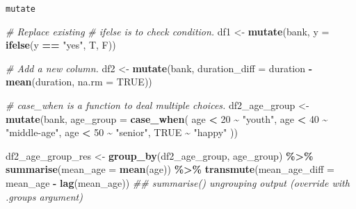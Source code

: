 \documentclass[
  10pt,
  ignorenonframetext,
  serif]{beamer}
\newenvironment{Shaded}{\begin{snugshade}}{\end{snugshade}}
\newcommand{\CommentTok}[1]{\textcolor[rgb]{0.56,0.35,0.01}{\textit{#1}}}
\newcommand{\DataTypeTok}[1]{\textcolor[rgb]{0.13,0.29,0.53}{#1}}
\newcommand{\DecValTok}[1]{\textcolor[rgb]{0.00,0.00,0.81}{#1}}
\newcommand{\KeywordTok}[1]{\textcolor[rgb]{0.13,0.29,0.53}{\textbf{#1}}}
\newcommand{\NormalTok}[1]{#1}
\newcommand{\OperatorTok}[1]{\textcolor[rgb]{0.81,0.36,0.00}{\textbf{#1}}}
\newcommand{\OtherTok}[1]{\textcolor[rgb]{0.56,0.35,0.01}{#1}}
\newcommand{\StringTok}[1]{\textcolor[rgb]{0.31,0.60,0.02}{#1}}
\begin{document}
\begin{frame}[fragile]{\texttt{mutate}}
\protect\hypertarget{mutate}{}
\begin{Shaded}
\begin{Highlighting}[]
\CommentTok{\# Replace existing}
\CommentTok{\# ifelse is to check condition.}
\NormalTok{df1 \textless{}{-}}\StringTok{ }\KeywordTok{mutate}\NormalTok{(bank, }\DataTypeTok{y =} \KeywordTok{ifelse}\NormalTok{(y }\OperatorTok{==}\StringTok{ "yes"}\NormalTok{, T, F))}

\CommentTok{\# Add a new column.}
\NormalTok{df2 \textless{}{-}}\StringTok{ }\KeywordTok{mutate}\NormalTok{(bank, }\DataTypeTok{duration\_diff =}\NormalTok{ duration }\OperatorTok{{-}}\StringTok{ }\KeywordTok{mean}\NormalTok{(duration, }\DataTypeTok{na.rm =} \OtherTok{TRUE}\NormalTok{))}

\CommentTok{\# case\_when is a function to deal multiple choices.}
\NormalTok{df2\_age\_group \textless{}{-}}\StringTok{ }\KeywordTok{mutate}\NormalTok{(bank, }\DataTypeTok{age\_group =} \KeywordTok{case\_when}\NormalTok{(}
\NormalTok{  age }\OperatorTok{\textless{}}\StringTok{ }\DecValTok{20} \OperatorTok{\textasciitilde{}}\StringTok{ "youth"}\NormalTok{,}
\NormalTok{  age }\OperatorTok{\textless{}}\StringTok{ }\DecValTok{40} \OperatorTok{\textasciitilde{}}\StringTok{ "middle{-}age"}\NormalTok{,}
\NormalTok{  age }\OperatorTok{\textless{}}\StringTok{ }\DecValTok{50} \OperatorTok{\textasciitilde{}}\StringTok{ "senior"}\NormalTok{,}
  \OtherTok{TRUE} \OperatorTok{\textasciitilde{}}\StringTok{ "happy"}
\NormalTok{))}

\NormalTok{df2\_age\_group\_res \textless{}{-}}
\StringTok{  }\KeywordTok{group\_by}\NormalTok{(df2\_age\_group, age\_group) }\OperatorTok{\%\textgreater{}\%}
\StringTok{  }\KeywordTok{summarise}\NormalTok{(}\DataTypeTok{mean\_age =} \KeywordTok{mean}\NormalTok{(age)) }\OperatorTok{\%\textgreater{}\%}
\StringTok{  }\KeywordTok{transmute}\NormalTok{(}\DataTypeTok{mean\_age\_diff =}\NormalTok{ mean\_age }\OperatorTok{{-}}\StringTok{ }\KeywordTok{lag}\NormalTok{(mean\_age))}
\CommentTok{\#\# \textasciigrave{}summarise()\textasciigrave{} ungrouping output (override with \textasciigrave{}.groups\textasciigrave{} argument)}
\end{Highlighting}
\end{Shaded}
\end{frame}
\end{document}
